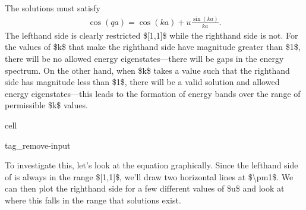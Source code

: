 \documentclass[letterpaper,10pt,english]{jupyterBook}
\begin{document}
\sphinxAtStartPar
The solutions must satisfy
\begin{equation}\label{equation:kronig-penney:KP-Econd}
\begin{split}\cos(qa) = \cos(ka) + u \frac{\sin(ka)}{ka}. \end{split}
\end{equation}
\sphinxAtStartPar
The left\sphinxhyphen{}hand side is clearly restricted \${[}\sphinxhyphen{}1,1{]}\$ while the right\sphinxhyphen{}hand side is not. For the values of \$k\$ that make the right\sphinxhyphen{}hand side have magnitude greater than \$1\$, there will be no allowed energy eigenstates—there will be gaps in the energy spectrum. On the other hand, when \$k\$ takes a value such that the right\sphinxhyphen{}hand side has magnitude less than \$1\$, there will be a valid solution and allowed energy eigenstates—this leads to the formation of energy bands over the range of permissible \$k\$ values.

\begin{sphinxuseclass}{cell}
\begin{sphinxuseclass}{tag_remove-input}
\end{sphinxuseclass}
\end{sphinxuseclass}
\sphinxAtStartPar
To investigate this, let’s look at the equation graphically. Since the left\sphinxhyphen{}hand side of {\hyperref[\detokenize{kronig-penney:equation-kp-econd}]{}} is always in the range \${[}\sphinxhyphen{}1,1{]}\$, we’ll draw two horizontal lines at \$\textbackslash{}pm1\$. We can then plot the right\sphinxhyphen{}hand side for a few different values of \$u\$ and look at where this falls in the range that solutions exist.
\end{document}
